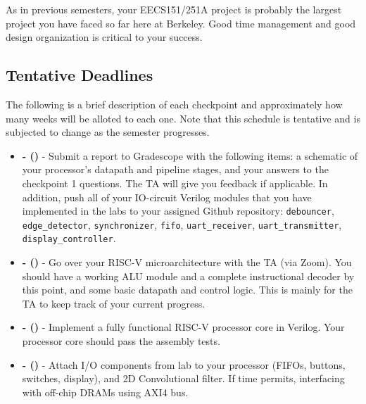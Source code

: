 \documentclass[11pt]{article}
\begin{document}
As in previous semesters, your EECS151/251A project is probably the largest project you have faced so far here at Berkeley.
Good time management and good design organization is critical to your success.

\subsection{Tentative Deadlines}
\label{tentative_deadlines}
The following is a brief description of each checkpoint and approximately how many weeks will be alloted to each one. Note that this schedule is tentative and is subjected to change as the semester progresses.


\begin{itemize}

  \item \textbf{\blockDiagramDueDate \space - \blockDiagramTaskName \space (\blockDiagramTimeAlloted)} - Submit a report to Gradescope with the following items: a schematic of your processor's datapath and pipeline stages, and your answers to the checkpoint 1 questions. The TA will give you feedback if applicable. In addition, push all of your IO-circuit Verilog modules that you have implemented in the labs to your assigned Github repository: \verb|debouncer|, \verb|edge_detector|, \verb|synchronizer|, \verb|fifo|, \verb|uart_receiver|, \verb|uart_transmitter|, \verb|display_controller|.
  \item \textbf{\ALUDueDate \space - \ALUTaskName \space (\ALUTimeAlloted)} - Go over your RISC-V microarchitecture with the TA (via Zoom). You should have a working ALU module and a complete instructional decoder by this point, and some basic datapath and control logic. This is mainly for the TA to keep track of your current progress.
  \item \textbf{\baseCPUDueDate \space - \baseCPUTaskName \space (\baseCPUTimeAlloted)} - Implement a fully functional RISC-V processor core in Verilog. Your processor core should pass the assembly tests.
  \item \textbf{\imageDueDate \space - \imageTaskName \space (\imageTimeAlloted)} - Attach I/O components from lab to your processor (FIFOs, buttons, switches, display), and 2D Convolutional filter. If time permits, interfacing with off-chip DRAMs using AXI4 bus.


\end{itemize}
\end{document}
